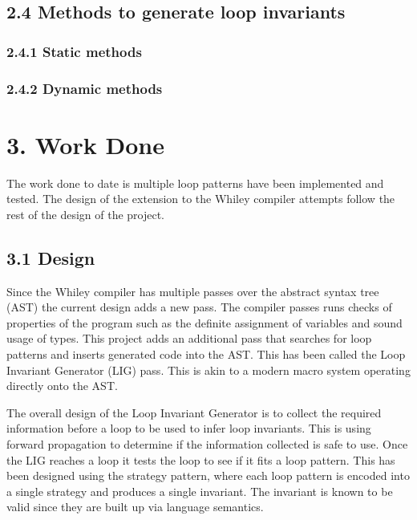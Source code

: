 \documentclass[11pt, a4paper, twoside, openright]{report}
\begin{document}
\subsection*{2.4 Methods to generate loop invariants}

\subsubsection*{2.4.1 Static methods}

\subsubsection*{2.4.2 Dynamic methods}

\section*{3. Work Done}

The work done to date is multiple loop patterns have been implemented and
tested. The design of the extension to the Whiley compiler attempts follow
the rest of the design of the project.

\subsection*{3.1 Design}

Since the Whiley compiler has multiple passes over the abstract syntax tree
(AST)
the current design adds a new pass. The compiler passes runs checks of properties
of the program such as the definite assignment of variables and sound usage of
types. This project adds an additional pass that searches for loop patterns and
inserts generated code into the AST.
This has been called the Loop Invariant Generator (LIG) pass.
This is akin to a modern macro system operating directly onto the AST.

The overall design of the Loop Invariant Generator is to collect the required
information before a loop to be used to infer loop invariants.
This is using forward propagation to determine if the
information collected is safe to use. Once the LIG reaches a loop
it tests the loop to see if it fits a loop pattern. This has been
designed using the strategy pattern, where each loop pattern is encoded
into a single strategy and produces a single invariant.
The invariant is known to be valid since they are built up via language
semantics.
\end{document}
